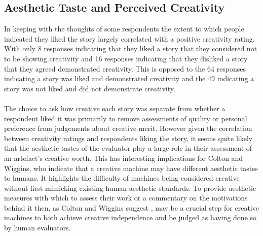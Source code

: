 \documentclass[letterpaper]{article}
\begin{document}
\subsection{Aesthetic Taste and Perceived Creativity} \label{sec:aesthetics}
In keeping with the thoughts of some respondents the extent to which people indicated they liked the story largely correlated with a positive creativity rating. With only 8 responses indicating that they liked a story that they considered not to be showing creativity and 16 responses indicating that they disliked a story that they agreed demonstrated creativity. This is opposed to the 64 responses indicating a story was liked and demonstrated creativity and the 49 indicating a story was not liked and did not demonstrate creativity.\\
\\The choice to ask how creative each story was separate from whether a respondent liked it was primarily to remove assessments of quality or personal preference from judgements about creative merit. However given the correlation between creativity ratings and respondents liking the story, it seems quite likely that the aesthetic tastes of the evaluator play a large role in their assessment of an artefact's creative worth. This has interesting implications for Colton and Wiggins, who indicate that a creative machine may have different aesthetic tastes to humans. It highlights the difficulty of machines being considered creative without first mimicking existing human aesthetic standards. To provide aesthetic measures with which to assess their work or a commentary on the motivations behind it then, as Colton and Wiggins suggest \cite{Colton_computationalcreativity}, may be a crucial step for creative machines to both achieve creative independence and be judged as having done so by human evaluators.

\end{document}
